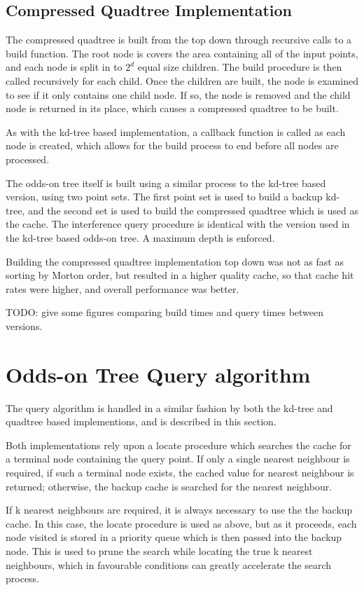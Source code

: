 \documentclass[mcs]{scsthesis}
\begin{document}
\subsection{Compressed Quadtree Implementation}

The compressed quadtree is built from the top down through recursive calls to a
build function. The root node is covers the area containing all of the input
points, and each node is split in to \(2^d\) equal size children. The build
procedure is then called recursively for each child. Once the children are
built, the node is examined to see if it only contains one child node. If so,
the node is removed and the child node is returned in its place, which causes
a compressed quadtree to be built.

As with the kd-tree based implementation, a callback function is called as
each node is created, which allows for the build process to end before all
nodes are processed.

The odds-on tree itself is built using a similar process to the kd-tree based
version, using two point sets. The first point set is used to build a backup
kd-tree, and the second set is used to build the compressed quadtree which
is used as the cache. The interference query procedure is identical with the
version used in the kd-tree based odds-on tree. A maximum depth is enforced.

Building the compressed quadtree implementation top down was not as fast as
sorting by Morton order, but resulted in a higher quality cache, so that cache
hit rates were higher, and overall performance was better.

TODO: give some figures comparing build times and query times between versions.

\section{Odds-on Tree Query algorithm}

The query algorithm is handled in a similar fashion by both the kd-tree and
quadtree based implementions, and is described in this section.

Both implementations rely upon a locate procedure which searches the cache for a
terminal node containing the query point. If only a single nearest neighbour
is required, if such a terminal node exists, the cached value for nearest
neighbour is returned; otherwise, the backup cache is searched for the
nearest neighbour.

If k nearest neighbours are required, it is always necessary to use the the
backup cache. In this case, the locate procedure is used as above, but as it
proceeds, each node visited is stored in a priority queue which is then passed
into the backup node. This is used to prune the search while locating the true
k nearest neighbours, which in favourable conditions can greatly accelerate
the search process.
\end{document}
